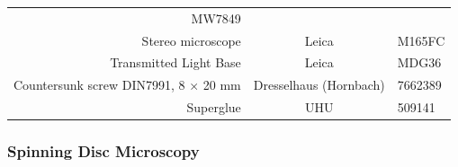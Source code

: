 \documentclass[11pt,singlespacinge,twoside]{reedthesis} %
\theoremstyle{definition}
\theoremstyle{definition}
\theoremstyle{definition}
\theoremstyle{remark}
\begin{document}
\begin{longtable}[]{@{}rcl@{}}
\begin{minipage}[t]{0.16\columnwidth}
MW7849\strut
\end{minipage}\tabularnewline
\begin{minipage}[t]{0.50\columnwidth}\raggedleft
Stereo microscope\strut
\end{minipage} & \begin{minipage}[t]{0.26\columnwidth}\centering
Leica\strut
\end{minipage} & \begin{minipage}[t]{0.16\columnwidth}\raggedright
M165FC\strut
\end{minipage}\tabularnewline
\begin{minipage}[t]{0.50\columnwidth}\raggedleft
Transmitted Light Base\strut
\end{minipage} & \begin{minipage}[t]{0.26\columnwidth}\centering
Leica\strut
\end{minipage} & \begin{minipage}[t]{0.16\columnwidth}\raggedright
MDG36\strut
\end{minipage}\tabularnewline
\begin{minipage}[t]{0.50\columnwidth}\raggedleft
Countersunk screw DIN7991, 8 × 20 mm\strut
\end{minipage} & \begin{minipage}[t]{0.26\columnwidth}\centering
Dresselhaus (Hornbach)\strut
\end{minipage} & \begin{minipage}[t]{0.16\columnwidth}\raggedright
7662389\strut
\end{minipage}\tabularnewline
\begin{minipage}[t]{0.50\columnwidth}\raggedleft
Superglue\strut
\end{minipage} & \begin{minipage}[t]{0.26\columnwidth}\centering
UHU\strut
\end{minipage} & \begin{minipage}[t]{0.16\columnwidth}\raggedright
509141\strut
\end{minipage}\tabularnewline
\bottomrule
\end{longtable}
\hypertarget{mat-SD}{%
\subsubsection{Spinning Disc Microscopy}\label{mat-SD}}
\end{document}
